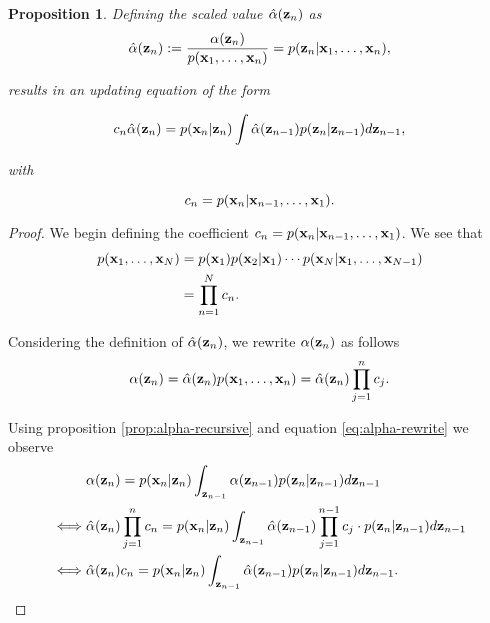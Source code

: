 \documentclass[11pt]{article}
\numberwithin{equation}{section}
\newcommand{\x}{{\bf x}}
\newcommand{\z}{{\bf z}}
\newtheorem{proposition}{Proposition}[section]
\begin{document}
\begin{proposition} \label{prop:alpha-hat}
	Defining the scaled value $\hat\alpha(\z_n)$ as
	\begin{equation}
		\hat\alpha(\z_n) := \frac{\alpha(\z_n)}{p(\x_1, \ldots, \x_n)} = p(\z_n \vert \x_1, \ldots, \x_n),
	\end{equation}
	
	results in an updating equation of the form
	
	\begin{equation}
		 c_n \hat\alpha(\z_n) = p(\x_n\vert\z_n)\int \hat\alpha(\z_{n-1})p(\z_n \vert \z_{n-1}) d\z_{n-1},
	\end{equation}
	
	with
	
	\begin{equation}
		c_n = p(\x_n \vert \x_{n-1}, \ldots, \x_1).
	\end{equation}
\end{proposition}

\begin{proof}
	We begin defining the coefficient $c_n = p(\x_n \vert \x_{n-1}, \ldots, \x_1)$. We see that
	\begin{align}
		p(\x_1, \ldots, \x_N) &=  p(\x_1) p(\x_2 \vert \x_1) \cdots p(\x_N \vert \x_1, \ldots, \x_{N-1})\\
		&= \prod_{n=1}^N c_n.
	\end{align}
	
	Considering the definition of $\hat\alpha(\z_n)$, we rewrite $\alpha(\z_n)$ as follows
	\begin{equation} \label{eq:alpha-rewrite}
		\alpha(\z_n) = \hat\alpha(\z_n) p(\x_1, \ldots, \x_n) = \hat\alpha(\z_n) \prod_{j=1}^n c_j.
	\end{equation}
	
	Using proposition \ref{prop:alpha-recursive} and equation \eqref{eq:alpha-rewrite} we observe
	\begin{align}
		&\alpha(\z_n) = p(\x_n\vert \z_n) \int_{\z_{n-1}} \alpha(\z_{n-1})p(\z_n\vert\z_{n-1}) d\z_{n-1}\\
		\iff & \hat\alpha(\z_n) \prod_{j=1}^{n} c_n = p(\x_n \vert \z_n) \int_{\z_{n-1}} \hat\alpha(\z_{n-1}) \prod_{j=1}^{n-1} c_j \cdot  p(\z_n\vert\z_{n-1}) d\z_{n-1}\\
		\iff & \hat\alpha(\z_n) c_n =   p(\x_n \vert \z_n) \int_{\z_{n-1}} \hat\alpha(\z_{n-1})   p(\z_n\vert\z_{n-1}) d\z_{n-1}.
	\end{align}
	
	
\end{proof}
\end{document}
